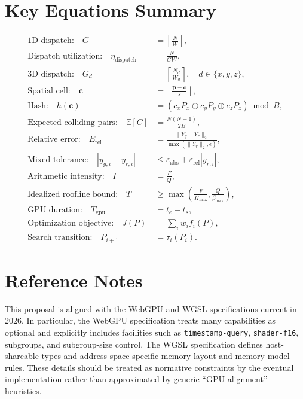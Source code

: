 \documentclass[11pt,a4paper,oneside]{report}
\begin{document}
\chapter{Key Equations Summary}

\begin{align}
\text{1D dispatch:}\quad
G &= \left\lceil\frac{N}{W}\right\rceil,\\[0.4em]
\text{Dispatch utilization:}\quad
\eta_{\mathrm{dispatch}} &= \frac{N}{GW},\\[0.4em]
\text{3D dispatch:}\quad
G_d &= \left\lceil\frac{N_d}{W_d}\right\rceil,\quad d\in\{x,y,z\},\\[0.4em]
\text{Spatial cell:}\quad
\mathbf{c} &= \left\lfloor\frac{\mathbf{p}-\mathbf{o}}{s}\right\rfloor,\\[0.4em]
\text{Hash:}\quad
h(\mathbf{c}) &=
(c_xP_x\oplus c_yP_y\oplus c_zP_z)\bmod B,\\[0.4em]
\text{Expected colliding pairs:}\quad
\mathbb{E}[C] &= \frac{N(N-1)}{2B},\\[0.4em]
\text{Relative error:}\quad
E_{\mathrm{rel}} &=
\frac{\|Y_g-Y_r\|_2}
{\max(\|Y_r\|_2,\epsilon)},\\[0.4em]
\text{Mixed tolerance:}\quad
|y_{g,i}-y_{r,i}| &\le \varepsilon_{\mathrm{abs}}+
\varepsilon_{\mathrm{rel}}|y_{r,i}|,\\[0.4em]
\text{Arithmetic intensity:}\quad
I &= \frac{F}{Q},\\[0.4em]
\text{Idealized roofline bound:}\quad
T &\ge \max\left(\frac{F}{\Pi_{\max}},\frac{Q}{\beta_{\max}}\right),\\[0.4em]
\text{GPU duration:}\quad
T_{\mathrm{gpu}} &= t_e-t_s,\\[0.4em]
\text{Optimization objective:}\quad
J(P) &=
\sum_i w_i f_i(P),\\[0.4em]
\text{Search transition:}\quad
P_{i+1} &= \tau_i(P_i).
\end{align}

\chapter{Reference Notes}

This proposal is aligned with the WebGPU and WGSL specifications current in 2026. In particular,
the WebGPU specification treats many capabilities as optional and explicitly includes facilities
such as \texttt{timestamp-query}, \texttt{shader-f16}, subgroups, and subgroup-size control.
The WGSL specification defines host-shareable types and address-space-specific memory layout and
memory-model rules. These details should be treated as normative constraints by the eventual
implementation rather than approximated by generic ``GPU alignment'' heuristics.
\end{document}
